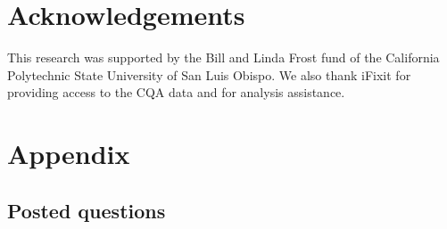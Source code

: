 \documentclass[preprint]{elsarticle}\usepackage[]{graphicx}\usepackage[]{color}
\begin{document}

\section{Acknowledgements}

This research was supported by the Bill and Linda Frost fund of the California Polytechnic State University of San Luis Obispo. We also thank iFixit for providing access to the CQA data and for analysis assistance.


\section{Appendix} 

\subsection{Posted questions}

\end{document}
